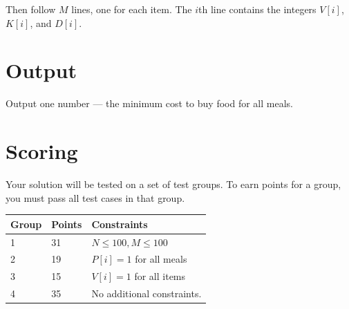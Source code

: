 Then follow $M$ lines, one for each item.
The $i$th line contains the integers $V[i]$, $K[i]$, and $D[i]$.

\section*{Output}
Output one number --- the minimum cost to buy food for all meals.

\section*{Scoring}
Your solution will be tested on a set of test groups. To earn points for a group, you must pass all test cases in that group.

\noindent
\begin{tabular}{| l | l | l |}
\hline
  Group & Points & Constraints \\ \hline
  1     & 31         & $N \le 100, M \le 100$ \\ \hline
  2     & 19         & $P[i] = 1$ for all meals \\ \hline
  3     & 15         & $V[i] = 1$ for all items \\ \hline
  4     & 35         & No additional constraints. \\ \hline
\end{tabular}
